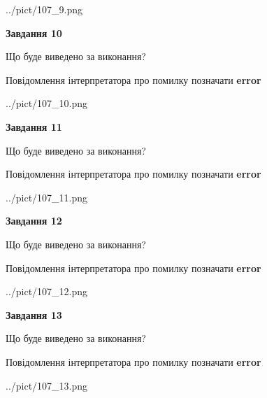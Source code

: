 \documentclass[11pt, ukrainian]{article}
\begin{document}
{\begin {large}
\begin{center}
	{../pict/107_9.png}
\end{center}
\newpage

{\begin {center}\textbf{Завдання 10}\end {center}}\par
Що буде виведено за виконання? \par
Повідомлення інтерпретатора про помилку позначати \textbf{error}

\begin{center}
	{../pict/107_10.png}
\end{center}
\newpage

{\begin {center}\textbf{Завдання 11}\end {center}}\par
Що буде виведено за виконання? \par
Повідомлення інтерпретатора про помилку позначати \textbf{error}

\begin{center}
	{../pict/107_11.png}
\end{center}
\newpage

{\begin {center}\textbf{Завдання 12}\end {center}}\par
Що буде виведено за виконання? \par
Повідомлення інтерпретатора про помилку позначати \textbf{error}

\begin{center}
	{../pict/107_12.png}
\end{center}
\newpage

{\begin {center}\textbf{Завдання 13}\end {center}}\par
Що буде виведено за виконання? \par
Повідомлення інтерпретатора про помилку позначати \textbf{error}

\begin{center}
	{../pict/107_13.png}
\end{center}
\newpage


\end{large}}
\end{document}
